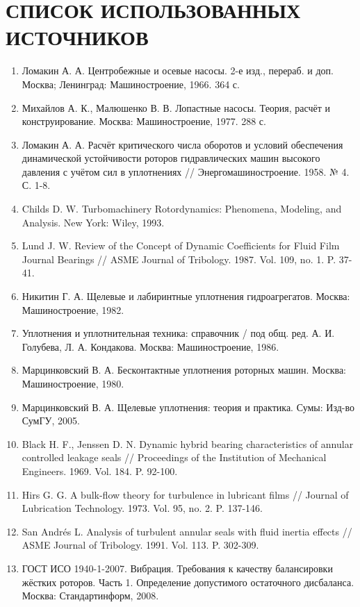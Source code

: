 \newpage
{}
{}
\section*{СПИСОК ИСПОЛЬЗОВАННЫХ ИСТОЧНИКОВ}
\begin{enumerate}
    \item Ломакин А. А. Центробежные и осевые насосы. 2-е изд., перераб. и доп. Москва; Ленинград: Машиностроение, 1966. 364 с.
    \item Михайлов А. К., Малюшенко В. В. Лопастные насосы. Теория, расчёт и конструирование. Москва: Машиностроение, 1977. 288 с.
    \item Ломакин А. А. Расчёт критического числа оборотов и условий обеспечения динамической устойчивости роторов гидравлических машин высокого давления с учётом сил в уплотнениях // Энергомашиностроение. 1958. № 4. С. 1-8.
    \item Childs D. W. Turbomachinery Rotordynamics: Phenomena, Modeling, and Analysis. New York: Wiley, 1993.
    \item Lund J. W. Review of the Concept of Dynamic Coefficients for Fluid Film Journal Bearings // ASME Journal of Tribology. 1987. Vol. 109, no. 1. P. 37-41.
    \item Никитин Г. А. Щелевые и лабиринтные уплотнения гидроагрегатов. Москва: Машиностроение, 1982.
    \item Уплотнения и уплотнительная техника: справочник / под общ. ред. А. И. Голубева, Л. А. Кондакова. Москва: Машиностроение, 1986.
    \item Марцинковский В. А. Бесконтактные уплотнения роторных машин. Москва: Машиностроение, 1980.
    \item Марцинковский В. А. Щелевые уплотнения: теория и практика. Сумы: Изд-во СумГУ, 2005.
    \item Black H. F., Jenssen D. N. Dynamic hybrid bearing characteristics of annular controlled leakage seals // Proceedings of the Institution of Mechanical Engineers. 1969. Vol. 184. P. 92-100.
    \item Hirs G. G. A bulk-flow theory for turbulence in lubricant films // Journal of Lubrication Technology. 1973. Vol. 95, no. 2. P. 137-146.
    \item San Andrés L. Analysis of turbulent annular seals with fluid inertia effects // ASME Journal of Tribology. 1991. Vol. 113. P. 302-309.
    \item ГОСТ ИСО 1940-1-2007. Вибрация. Требования к качеству балансировки жёстких роторов. Часть 1. Определение допустимого остаточного дисбаланса. Москва: Стандартинформ, 2008.

\end{enumerate}
